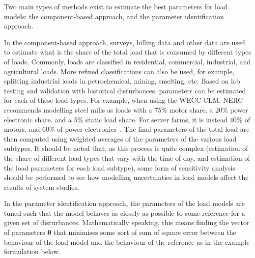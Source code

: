 
Two main types of methods exist to estimate the best parameters for load models: the component-based approach, and the parameter identification approach.

In the component-based approach, surveys, billing data and other data are used to estimate what is the share of the total load that is consumed by different types of loads. Commonly, loads are classified in residential, commercial, industrial, and agricultural loads. More refined classifications can also be used, for example, splitting industrial loads in petrochemical, mining, smelting, etc. Based on lab testing and validation with historical disturbances, parameters can be estimated for each of these load types. For example, when using the WECC CLM, NERC recommends modelling steel mills as loads with a 75\% motor share, a 20\% power electronic share, and a 5\% static load share. For server farms, it is instead 40\% of motors, and 60\% of power electronics~\cite{component_based}. The final parameters of the total load are then computed using weighted averages of the parameters of the various load subtypes. It should be noted that, as this process is quite complex (estimation of the share of different load types that vary with the time of day, and estimation of the load parameters for each load subtype), some form of sensitivity analysis should be performed to see how modelling uncertainties in load models affect the results of system studies.

In the parameter identification approach, the parameters of the load models are tuned such that the model behaves as closely as possible to some reference for a given set of disturbances. Mathematically speaking, this means finding the vector of parameters \(\bm{\theta}\) that minimises some sort of sum of square error between the behaviour of the load model and the behaviour of the reference as in the example formulation below.

